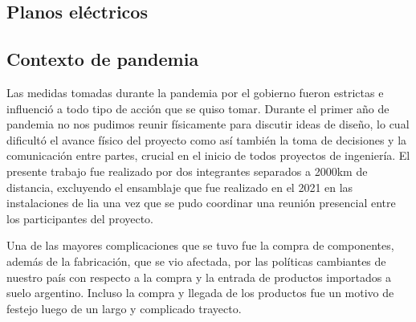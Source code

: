 \clearpage


\subsection{Planos eléctricos}



\subsection{Contexto de pandemia}
Las medidas tomadas durante la pandemia por el gobierno fueron estrictas e influenció a todo tipo de acción que se quiso tomar. Durante el primer año de pandemia no nos pudimos reunir físicamente para discutir ideas de diseño, lo cual dificultó el avance físico del proyecto como así también la toma de decisiones y la comunicación entre partes, crucial en el inicio de todos proyectos de ingeniería.
El presente trabajo fue realizado por dos integrantes separados a 2000km de distancia, excluyendo el ensamblaje que fue realizado en el 2021 en las instalaciones de \gls{lia} una vez que se pudo coordinar una reunión presencial entre los participantes del proyecto.
\medskip

Una de las mayores complicaciones que se tuvo fue la compra de
componentes, además de la fabricación, que se vio afectada, por las políticas cambiantes de
nuestro país con respecto a la compra y la entrada de productos importados a suelo argentino.
Incluso la compra y llegada de los productos fue un motivo de festejo luego de un largo y complicado trayecto.

